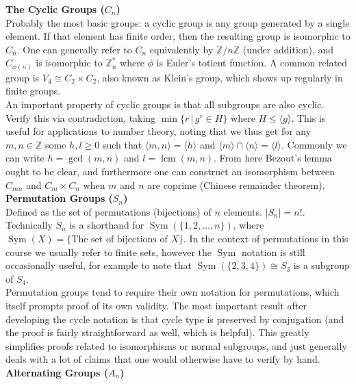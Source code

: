 \documentclass{tikzposter} %
\DeclareMathOperator{\lcm}{lcm}
\DeclareMathOperator{\Sym}{Sym}
\begin{document}
\begin{columns}
{  \textbf{The Cyclic Groups ($C_{n}$)} \\
  Probably the most basic groups: a cyclic group is any group generated by a single element. If that element has finite order, then the resulting group is isomorphic to $C_{n}$. One can generally refer to $C_{n}$ equivalently by $\mathbb{Z} / n\mathbb{Z}$ (under addition), and $C_{\phi(n)}$ is isomorphic to $\mathbb{Z}^{\ast}_{n}$ where $\phi$ is Euler's totient function. A common related group is $V_{4} \cong C_{2} \times C_{2}$, also known as Klein's group, which shows up regularly in finite groups. \\

  An important property of cyclic groups is that all subgroups are also cyclic. Verify this via contradiction, taking $\min\{r \,|\, g^{r} \in H\}$ where $H \le \langle g \rangle $. This is useful for applications to number theory, noting that we thus get for any $m, n \in \mathbb{Z}$ some $h, l \ge 0$ such that $\langle m, n \rangle = \langle h \rangle$ and $\langle m \rangle \cap \langle n \rangle = \langle l \rangle$. Commonly we can write $h = \gcd(m,n)$ and $l = \lcm(m,n)$. From here Bezout's lemma ought to be clear, and furthermore one can construct an isomorphism between $C_{mn}$ and $C_{m} \times C_{n}$ when $m$ and $n$ are coprime (Chinese remainder theorem). \\

  \textbf{Permutation Groups ($S_{n}$)} \\
  Defined as the set of permutations (bijections) of $n$ elements. $|S_{n}| = n!$. Technically $S_{n}$ is a shorthand for $\Sym(\{1, 2, \dots, n\})$, where $\Sym(X) = \{\text{The set of bijections of $X$}\}$. In the context of permutations in this course we usually refer to finite sets, however the $\Sym$ notation is still occasionally useful, for example to note that $\Sym(\{2, 3, 4\}) \cong S_{3}$ is a subgroup of $S_{4}$. \\

  Permutation groups tend to require their own notation for permutations, which itself prompts proof of its own validity. The most important result after developing the cycle notation is that cycle type is preserved by conjugation (and the proof is fairly straightforward as well, which is helpful). This greatly simplifies proofs related to isomorphisms or normal subgroups, and just generally deals with a lot of claims that one would otherwise have to verify by hand. \\

  \textbf{Alternating Groups ($A_{n}$)} \\

}
\end{columns}
\end{document}
